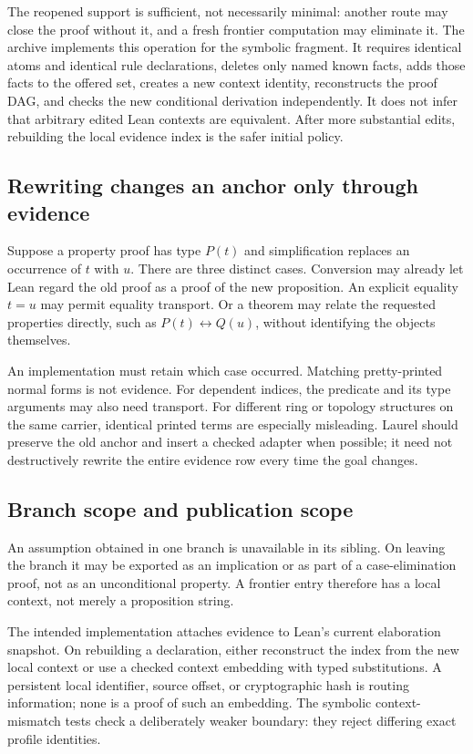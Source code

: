 \documentclass[11pt,a4paper]{article}
\theoremstyle{definition}
\theoremstyle{remark}
\begin{document}
The reopened support is sufficient, not necessarily minimal: another route may close the proof without it, and a fresh frontier computation may eliminate it. The archive implements this operation for the symbolic fragment. It requires identical atoms and identical rule declarations, deletes only named known facts, adds those facts to the offered set, creates a new context identity, reconstructs the proof DAG, and checks the new conditional derivation independently. It does not infer that arbitrary edited Lean contexts are equivalent. After more substantial edits, rebuilding the local evidence index is the safer initial policy.

\subsection{Rewriting changes an anchor only through evidence}
Suppose a property proof has type $P(t)$ and simplification replaces an occurrence of $t$ with $u$. There are three distinct cases. Conversion may already let Lean regard the old proof as a proof of the new proposition. An explicit equality $t=u$ may permit equality transport. Or a theorem may relate the requested properties directly, such as $P(t)\leftrightarrow Q(u)$, without identifying the objects themselves.

An implementation must retain which case occurred. Matching pretty-printed normal forms is not evidence. For dependent indices, the predicate and its type arguments may also need transport. For different ring or topology structures on the same carrier, identical printed terms are especially misleading. Laurel should preserve the old anchor and insert a checked adapter when possible; it need not destructively rewrite the entire evidence row every time the goal changes.

\subsection{Branch scope and publication scope}
An assumption obtained in one branch is unavailable in its sibling. On leaving the branch it may be exported as an implication or as part of a case-elimination proof, not as an unconditional property. A frontier entry therefore has a local context, not merely a proposition string.

The intended implementation attaches evidence to Lean's current elaboration snapshot. On rebuilding a declaration, either reconstruct the index from the new local context or use a checked context embedding with typed substitutions. A persistent local identifier, source offset, or cryptographic hash is routing information; none is a proof of such an embedding. The symbolic context-mismatch tests check a deliberately weaker boundary: they reject differing exact profile identities.
\end{document}
